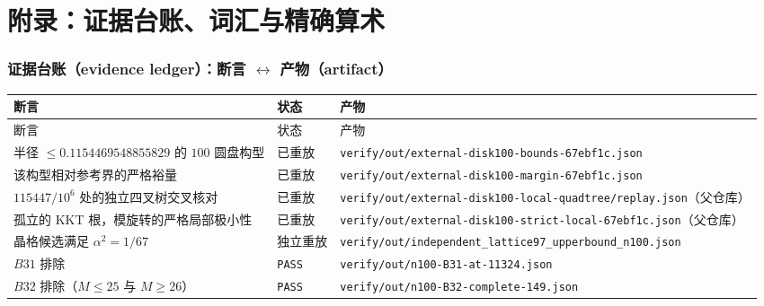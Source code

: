 \appendix
\part*{附录：证据台账、词汇与精确算术}
\setcounter{section}{0}

\section{证据台账（evidence ledger）：断言 $\leftrightarrow$ 产物（artifact）}

{\footnotesize
\begin{longtable}{@{}@{}>{\raggedright\arraybackslash}p{}>{\raggedright\arraybackslash}p{}>{\raggedright\arraybackslash}p{}@{}}
\toprule
断言 & 状态 & 产物 \\
\midrule
\endfirsthead
\toprule
断言 & 状态 & 产物 \\
\midrule
\endhead
\bottomrule
\endlastfoot
半径 $\le0.1154469548855829$ 的 $100$ 圆盘构型 & 已重放 &
{\footnotesize\texttt{verify/\allowbreak{}out/\allowbreak{}external-\allowbreak{}disk100-\allowbreak{}bounds-\allowbreak{}67ebf1c.json}} \\
该构型相对参考界的严格裕量 & 已重放 &
{\footnotesize\texttt{verify/\allowbreak{}out/\allowbreak{}external-\allowbreak{}disk100-\allowbreak{}margin-\allowbreak{}67ebf1c.json}} \\
$115447/10^{6}$ 处的独立四叉树交叉核对 & 已重放 &
\texttt{verify/\allowbreak{}out/\allowbreak{}external-\allowbreak{}disk100-\allowbreak{}local-\allowbreak{}quadtree/\allowbreak{}replay.json}（父仓库） \\
孤立的 KKT 根，模旋转的严格局部极小性 & 已重放 &
{\footnotesize\texttt{verify/\allowbreak{}out/\allowbreak{}external-\allowbreak{}disk100-\allowbreak{}strict-\allowbreak{}local-\allowbreak{}67ebf1c.json}}（父仓库） \\
晶格候选满足 $\alpha^2=1/67$ & 独立重放 &
{\footnotesize\texttt{verify/\allowbreak{}out/\allowbreak{}independent\_\allowbreak{}lattice97\_\allowbreak{}upperbound\_\allowbreak{}n100.json}} \\
$B31$ 排除 & \texttt{PASS} & \texttt{verify/\allowbreak{}out/\allowbreak{}n100-\allowbreak{}B31-\allowbreak{}at-\allowbreak{}11324.json} \\
$B32$ 排除（$M\le25$ 与 $M\ge26$） & \texttt{PASS} &
\texttt{verify/\allowbreak{}out/\allowbreak{}n100-\allowbreak{}B32-\allowbreak{}complete-\allowbreak{}149.json} \\

\end{longtable}}
